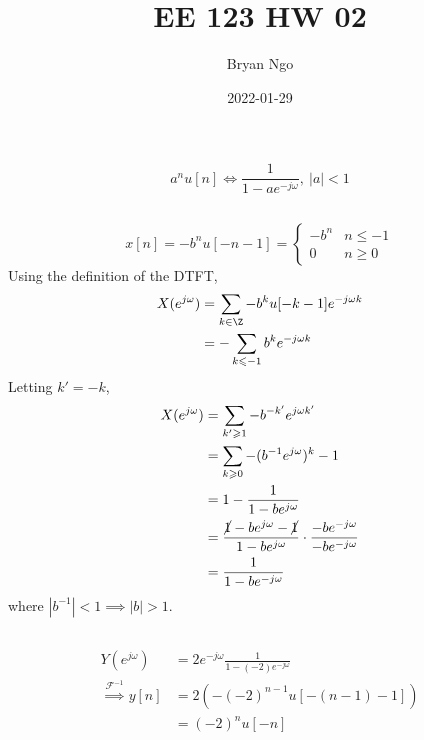 \documentclass{article}
\title{EE 123 HW 02}
\author{Bryan Ngo}
\date{2022-01-29}
\begin{document}
\maketitle

\setcounter{section}{2}

\section{}

\begin{equation}
    a^n u[n] \iff \frac{1}{1 - ae^{-j \omega}}, \ |a| < 1
\end{equation}

\subsection{}

\begin{equation}
    x[n] = -b^n u[-n - 1] =
    \begin{cases}
        -b^n & n \leqslant -1 \\
        0 & n \geqslant 0
    \end{cases}
\end{equation}
Using the definition of the DTFT,
\begin{align}
    X(e^{j \omega}) &= \sum_{k \in \Z} -b^k u[-k - 1] e^{-j \omega k} \\
    &= -\sum_{k \leqslant -1} b^k e^{-j \omega k}
\end{align}
Letting \(k' = -k\),
\begin{align}
    X(e^{j \omega}) &= \sum_{k' \geqslant 1} -b^{-k'} e^{j \omega k'} \\
    &= \sum_{k \geqslant 0} -(b^{-1} e^{j \omega})^k - 1 \\
    &= 1 - \frac{1}{1 - b e^{j \omega}} \\
    &= \frac{\cancel{1} - b e^{j \omega} - \cancel{1}}{1 - b e^{j \omega}} \cdot \frac{-b e^{-j \omega}}{-b e^{-j \omega}} \\
    &= \frac{1}{1 - b e^{-j \omega}}
\end{align}
where \(|b^{-1}| < 1 \implies |b| > 1\).

\subsection{}

\begin{align}
    Y(e^{j \omega}) &= 2e^{-j \omega} \frac{1}{1 - (-2) e^{-j \omega}} \\
    \overset{\mathcal{F}^{-1}}{\implies} y[n] &= 2 (-(-2)^{n - 1} u[-(n - 1) - 1]) \\
    &= (-2)^n u[-n]
\end{align}
\end{document}
